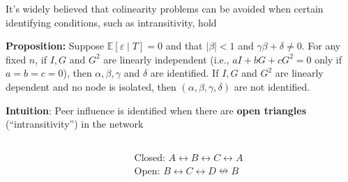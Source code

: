 \documentclass[final]{beamer}
\newlength{\colwidth}
\begin{document}
\begin{frame}[t]
\begin{columns}[t]
\begin{column}{\colwidth}
            \begin{block}{It's widely believed that colinearity problems can be avoided when certain identifying conditions, such as intransitivity, hold}

                \textbf{Proposition:}
                Suppose $\mathbb E[\varepsilon \mid T] = 0$ and that $|\beta| < 1$ and $\gamma \beta + \delta \neq 0$. For any fixed $n$, if $I, G$ and $G^2$ are linearly independent (i.e., $a I + b G + c G^2 = 0$ only if $a = b = c = 0$), then $\alpha, \beta, \gamma$ and $\delta$ are identified. If $I, G$ and $G^2$ are linearly dependent and no node is isolated, then $(\alpha, \beta, \gamma, \delta)$ are not identified.

                \textbf{Intuition}: Peer influence is identified when there are \textbf{open triangles} (``intransitivity'') in the network
                \vspace{8mm}
                \begin{columns}
                    \begin{column}{0.5\textwidth}
                        \centering
                    \end{column}
                    \begin{column}{0.5\textwidth}
                        \centering
                        Closed: \textcolor{Mahogany}{$A \leftrightarrow B \leftrightarrow C \leftrightarrow A$} \\
                        Open: $B \leftrightarrow C \leftrightarrow D \nleftrightarrow B$
                    \end{column}
                \end{columns}
            \end{block}

        \end{column}


\end{columns}
\end{frame}
\end{document}
